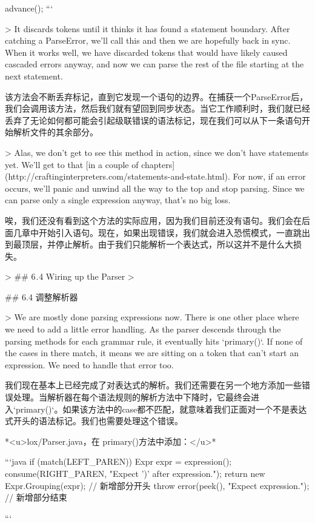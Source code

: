 \documentclass[cn,11pt,chinese]{elegantbook}
\begin{document}
{{{      advance();
    }
  }
```

> It discards tokens until it thinks it has found a statement boundary. After catching a ParseError, we’ll call this and then we are hopefully back in sync. When it works well, we have discarded tokens that would have likely caused cascaded errors anyway, and now we can parse the rest of the file starting at the next statement.

该方法会不断丢弃标记，直到它发现一个语句的边界。在捕获一个ParseError后，我们会调用该方法，然后我们就有望回到同步状态。当它工作顺利时，我们就已经丢弃了无论如何都可能会引起级联错误的语法标记，现在我们可以从下一条语句开始解析文件的其余部分。

> Alas, we don’t get to see this method in action, since we don’t have statements yet. We’ll get to that [in a couple of chapters](http://craftinginterpreters.com/statements-and-state.html). For now, if an error occurs, we’ll panic and unwind all the way to the top and stop parsing. Since we can parse only a single expression anyway, that’s no big loss.

唉，我们还没有看到这个方法的实际应用，因为我们目前还没有语句。我们会在后面几章中开始引入语句。现在，如果出现错误，我们就会进入恐慌模式，一直跳出到最顶层，并停止解析。由于我们只能解析一个表达式，所以这并不是什么大损失。

> ## 6 . 4 Wiring up the Parser
>

## 6.4 调整解析器

> We are mostly done parsing expressions now. There is one other place where we need to add a little error handling. As the parser descends through the parsing methods for each grammar rule, it eventually hits `primary()`. If none of the cases in there match, it means we are sitting on a token that can’t start an expression. We need to handle that error too.

我们现在基本上已经完成了对表达式的解析。我们还需要在另一个地方添加一些错误处理。当解析器在每个语法规则的解析方法中下降时，它最终会进入`primary()`。如果该方法中的case都不匹配，就意味着我们正面对一个不是表达式开头的语法标记。我们也需要处理这个错误。

*<u>lox/Parser.java，在 primary()方法中添加：</u>*

```java
    if (match(LEFT_PAREN)) {
      Expr expr = expression();
      consume(RIGHT_PAREN, "Expect ')' after expression.");
      return new Expr.Grouping(expr);
    }
		// 新增部分开头
    throw error(peek(), "Expect expression.");
		// 新增部分结束
  }
```
\end{document}
